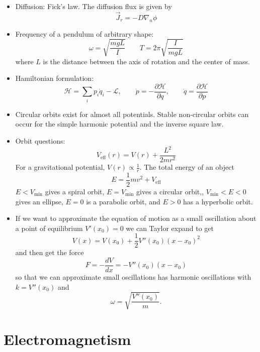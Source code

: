 \begin{itemize}
\item Diffusion: Fick's law. The diffusion flux is given by\[
\vec{J}_{r}=-D\nabla_{n}\phi\]

\item Frequency of a pendulum of arbitrary shape:\[
\omega=\sqrt{\frac{mgL}{I}}\qquad T=2\pi\sqrt{\frac{I}{mgL}}\]
where $L$ is the distance between the axis of rotation and the center
of mass.
\item Hamiltonian formulation:\[
\mathcal{H}=\sum_{i}p_{i}\dot{q}_{i}-\mathcal{L},\qquad\dot{p}=-\frac{\partial\mathcal{H}}{\partial q},\qquad\dot{q}=\frac{\partial\mathcal{H}}{\partial p}\]

\item Circular orbits exist for almost all potentials. Stable non-circular
orbits can occur for the simple harmonic potential and the inverse
square law.
\item Orbit questions:\[
V_{\text{eff}}(r)=V(r)+\frac{L^{2}}{2mr^{2}}\]
For a gravitational potential, $V(r)\propto\frac{1}{r}$. The total
energy of an object\[
E=\frac{1}{2}mv^{2}+V_{\text{eff}}\]
$E<V_{\text{min}}$ gives a spiral orbit, $E=V_{\text{min}}$ gives
a circular orbit,, $V_{\text{min}}<E<0$ gives an ellipse, $E=0$
is a parabolic orbit, and $E>0$ has a hyperbolic orbit.
\item If we want to approximate the equation of motion as a small oscillation
about a point of equilibrium $V'(x_{0})=0$ we can Taylor expand to
get\[
V(x)=V(x_{0})+\frac{1}{2}V''(x_{0})(x-x_{0})^{2}\]
and then get the force \[
F=-\frac{dV}{dx}=-V''(x_{0})(x-x_{0})\]
so that we can approximate small oscillations has harmonic oscillations
with $k=V''(x_{0})$ and\[
\omega=\sqrt{\frac{V''(x_{0})}{m}}.\]

\end{itemize}



















\chapter{Electromagnetism}


